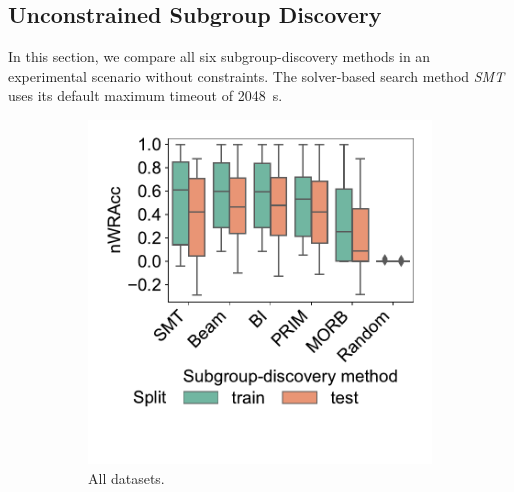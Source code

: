 \documentclass{article}
\theoremstyle{definition}
\begin{document}
\subsection{Unconstrained Subgroup Discovery}
\label{sec:csd:evaluation:unconstrained}

In this section, we compare all six subgroup-discovery methods in an experimental scenario without constraints.
The solver-based search method \emph{SMT} uses its default maximum timeout of 2048~s.

\begin{figure}[t]
	\centering
	\begin{subfigure}[t]{0.48\textwidth}
		\centering
		\includegraphics[width=\textwidth, trim=20 60 15 15, clip]{plots/csd-unconstrained-nwracc-all-datasets.pdf}
		\caption{All datasets.}
		\label{fig:csd:unconstrained-nwracc-all-datasets}
	\end{subfigure}
	\hfill
	\begin{subfigure}[t]{0.48\textwidth}
		\centering

\end{subfigure}
\end{figure}
\end{document}

